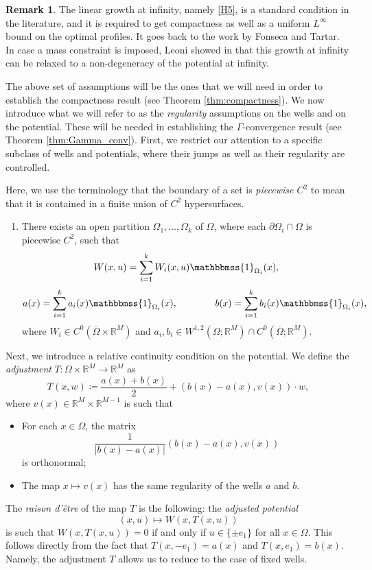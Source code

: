 \documentclass[a4paper, 11pt, reqno]{amsart}
\theoremstyle{plain}
\theoremstyle{definition}
\newtheorem{remark}[theorem]{Remark}
\theoremstyle{remark}
\newcommand{\R}{\mathbb R}
\newcommand{\ca}{\mathbb{1}}
\def\ca{\mathbbmss{1}}
\begin{document}
\begin{remark}
The linear growth at infinity, namely \ref{H5}, is a standard condition in the literature, and it is required to get compactness as well as a uniform $L^\infty$ bound on the optimal profiles. It goes back to the work \cite{FonTar} by Fonseca and Tartar.
In case a mass constraint is imposed, Leoni showed in \cite{Leo} that this growth at infinity can be relaxed to a non-degeneracy of the potential at infinity.
\end{remark}

The above set of assumptions will be the ones that we will need in order to establish the compactness result (see Theorem \ref{thm:compactness}).
We now introduce what we will refer to as the \emph{regularity} assumptions on the wells and on the potential. These will be needed in establishing the $\Gamma$-convergence result (see Theorem \ref{thm:Gamma_conv}).
First, we restrict our attention to a specific subclass of wells and potentials, where their jumps as well as their regularity are controlled.


Here, we use the terminology that the boundary of a set is \emph{piecewise $C^2$} to mean that it is contained in a finite union of $C^2$ hypersurfaces.
\begin{enumerate}[resume, label=(H\arabic*), ref=(H\arabic*)]
            \item \label{H6} There exists an open partition $\Omega_1,\ldots,\Omega_k$ of $\Omega$, where each $\partial\Omega_i \cap \Omega$ is piecewise $C^2$, such that
            \[
            W(x,u) = \sum_{i=1}^k W_i(x,u)\ca_{\Omega_i}(x),
            \]
            \[
            a(x) = \sum_{i=1}^k a_i(x)\ca_{\Omega_i}(x),\quad\quad\quad\quad
            b(x) = \sum_{i=1}^k b_i(x)\ca_{\Omega_i}(x),
            \]
            where $W_i\in C^0(\overline{\Omega}\times\R^M)$ and $a_i, b_i\in W^{1,2}(\Omega;\R^M) \cap C^0(\overline{\Omega};\R^M)$.\\
\end{enumerate}

Next, we introduce a relative continuity condition on the potential.
We define the \emph{adjustment}
$T \colon \Omega\times\R^M\to\R^M$ as
\begin{equation}\label{eq:adjustment}
T(x,w) \coloneqq  \frac{a(x)+b(x)}{2} + \left(b(x)-a(x), v(x)\right)\cdot w,
\end{equation}
where $v(x)\in \R^M\times\R^{M-1}$ is such that
\begin{itemize}
\item[(i)] For each $x\in \Omega$, the matrix
\[
\frac{1}{|b(x)-a(x)|}\left(b(x)-a(x), v(x)\right)
\]
is orthonormal;
\item[(ii)] The map $x\mapsto v(x)$ has the same regularity of the wells $a$ and $b$.
\end{itemize}
The \emph{raison d'\^{e}tre} of the map $T$ is the following: the \emph{adjusted potential}
\[
(x,u) \mapsto W(x, T(x,u))
\]
is such that $W(x, T(x,u))=0$ if and only if $u\in\{\pm e_1\}$ for all $x\in\Omega$.
This follows directly from the fact that $T(x,-e_1)=a(x)$ and $T(x,e_1)=b(x)$.
Namely, the adjustment $T$ allows us to reduce to the case of fixed wells.
\end{document}
